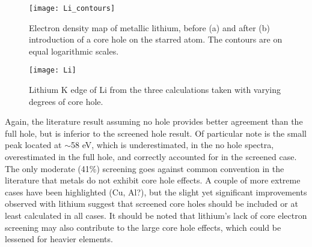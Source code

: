 \begin{figure}
	\centering
	\texttt{[image: Li\_contours]}
	\caption{Electron density map of metallic lithium, before (a) and after (b) introduction of a core hole on the starred atom.  The contours are on equal logarithmic scales.}
	\label{Li_countours}
\end{figure}




\begin{figure}
	\centering
	\texttt{[image: Li]}
	\caption{Lithium K edge of Li from the three calculations taken with varying degrees of core hole. }
	\label{Li_spectra}
\end{figure}


Again, the literature result assuming no hole provides better agreement than the full hole, but is inferior to the screened hole result.  Of particular note is the small peak located at $ \sim$58 eV, which is underestimated, in the no hole spectra, overestimated in the full hole, and correctly accounted for in the screened case.  The only moderate (41\%) screening goes against common convention in the literature that metals do not exhibit core hole effects.  A couple of more extreme cases have been highlighted  (Cu, Al?), but the slight yet significant improvements observed with lithium suggest that screened core holes should be included or at least calculated in all cases.  It should be noted that lithium's lack of core electron screening may also contribute to the large core hole effects, which could be lessened for heavier elements. 

